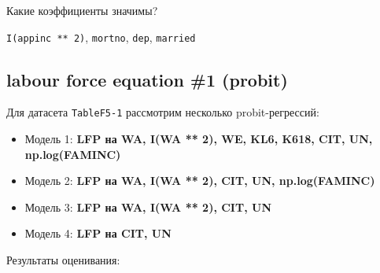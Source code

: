 \documentclass[
  russian,
]{article}
\providecommand{\tightlist}{%
  \setlength{\itemsep}{0pt}\setlength{\parskip}{0pt}}
\begin{document}
Какие коэффициенты значимы?

\begin{tcolorbox}[enhanced jigsaw, arc=.35mm, bottomrule=.15mm, bottomtitle=1mm, breakable, colback=white, colbacktitle=quarto-callout-note-color!10!white, colframe=quarto-callout-note-color-frame, coltitle=black, left=2mm, leftrule=.75mm, opacityback=0, opacitybacktitle=0.6, rightrule=.15mm, title=\textcolor{quarto-callout-note-color}{\faInfo}\hspace{0.5em}{Коэффициенты, значимые на уровне 5\% (по классическим стандартным
ошибкам)}, titlerule=0mm, toprule=.15mm, toptitle=1mm]

\texttt{I(appinc\ **\ 2)}, \texttt{mortno}, \texttt{dep},
\texttt{married}

\end{tcolorbox}

\subsection{labour force equation \#1
(probit)}\label{labour-force-equation-1-probit-2}

Для датасета \texttt{TableF5-1} рассмотрим несколько probit-регрессий:

\begin{itemize}
\tightlist
\item
  Модель 1: \textbf{LFP на WA, I(WA ** 2), WE, KL6, K618, CIT, UN,
  np.log(FAMINC)}
\item
  Модель 2: \textbf{LFP на WA, I(WA ** 2), CIT, UN, np.log(FAMINC)}
\item
  Модель 3: \textbf{LFP на WA, I(WA ** 2), CIT, UN}
\item
  Модель 4: \textbf{LFP на CIT, UN}
\end{itemize}

Результаты оценивания:
\end{document}
